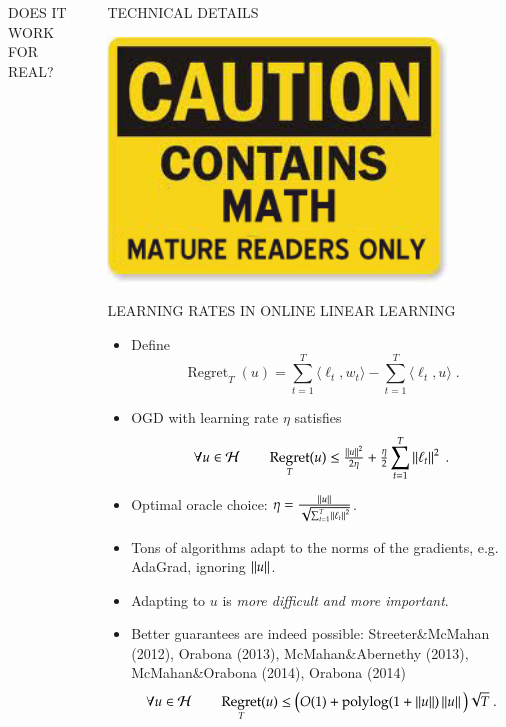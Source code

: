 \documentclass[final,t,serif,mathserif]{beamer}
\renewcommand{\H}{\mathcal{H}}  %
\DeclareMathOperator{\Regret}{Regret}
\DeclareMathOperator{\polylog}{polylog}
\def\blockspaceb{\vspace{0cm}}
\def\blockspacec{\vspace{-0.08cm}}
\begin{document}
\begin{frame}{}
\begin{columns}[t]
\begin{column}{.33\linewidth}
\begin{block}{DOES IT WORK FOR REAL?}
       \blockspaceb
       
    \end{block}
\end{column}


\begin{column}{.33\linewidth}

    \begin{block}{TECHNICAL DETAILS}
    \begin{minipage}{.98\linewidth}

    
    \center
    \includegraphics[width=9cm]{figs/MathCaution2}
    

    \begin{block}{LEARNING RATES IN ONLINE LINEAR LEARNING}
    \blockspacec
    
    \begin{itemize}
      \item Define
      \[
        \Regret_T(u) = \sum_{t=1}^T \langle \ell_t, w_t \rangle - \sum_{t=1}^T \langle \ell_t, u \rangle  \; .
      \]
      \item OGD with learning rate $\eta$ satisfies
	\[
	\forall u \in \H \qquad \Regret_T(u) \le \tfrac{\norm{u}^2}{2\eta} + \tfrac{\eta}{2} \sum_{t=1}^T \norm{\ell_t}^2 \; .
	\]
      \item Optimal oracle choice: $\eta = \frac{\left\|{u}\right\|}{\sqrt{\sum_{t=1}^T \left\|{\ell_t}\right\|^2}}$.
      \item Tons of algorithms adapt to the norms of the gradients, e.g. AdaGrad, ignoring $\left\|{u}\right\|$.
      \item Adapting to $u$ is \emph{more difficult and more important}.
      \item Better guarantees are indeed possible: Streeter\&McMahan (2012), Orabona (2013), McMahan\&Abernethy (2013), McMahan\&Orabona (2014), Orabona (2014) 
	\[
	\forall u \in \H \qquad \Regret_T(u) \le \big(O(1)+\polylog(1 + \norm{u})\norm{u} \big) \sqrt{T} \; .
	\]
    \end{itemize}
    

\end{block}
\end{minipage}
\end{block}
\end{column}
\end{columns}
\end{frame}
\end{document}
